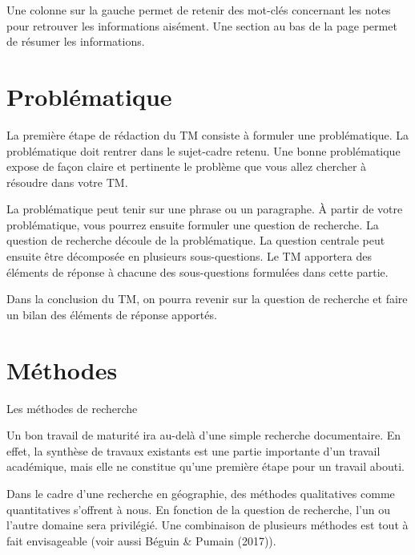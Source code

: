\documentclass[
  a4paper,
]{book}
\makeatletter
\renewcommand{\section}{\@startsection{section}{1}{\z@}
{-4ex \@plus -1ex \@minus -.4ex}
{1ex \@plus.2ex }
{\normalfont\large\sffamily\bfseries}}
\makeatother
\begin{document}
Une colonne sur la gauche permet de retenir des mot-clés concernant les
notes pour retrouver les informations aisément. Une section au bas de la
page permet de résumer les informations.

\hypertarget{probluxe9matique}{%
\chapter{Problématique}\label{probluxe9matique}}

La première étape de rédaction du TM consiste à formuler une
problématique. La problématique doit rentrer dans le sujet-cadre retenu.
Une bonne problématique expose de façon claire et pertinente le problème
que vous allez chercher à résoudre dans votre TM.

La problématique peut tenir sur une phrase ou un paragraphe. À partir de
votre problématique, vous pourrez ensuite formuler une question de
recherche. La question de recherche découle de la problématique. La
question centrale peut ensuite être décomposée en plusieurs
sous-questions. Le TM apportera des éléments de réponse à chacune des
sous-questions formulées dans cette partie.

Dans la conclusion du TM, on pourra revenir sur la question de recherche
et faire un bilan des éléments de réponse apportés.

\hypertarget{sec-methodes}{%
\chapter{Méthodes}\label{sec-methodes}}

\hypertarget{les-muxe9thodes-de-recherche}{%
\section{Les méthodes de recherche}\label{les-muxe9thodes-de-recherche}}

Un bon travail de maturité ira au-delà d'une simple recherche
documentaire. En effet, la synthèse de travaux existants est une partie
importante d'un travail académique, mais elle ne constitue qu'une
première étape pour un travail abouti.

Dans le cadre d'une recherche en géographie, des méthodes qualitatives
comme quantitatives s'offrent à nous. En fonction de la question de
recherche, l'un ou l'autre domaine sera privilégié. Une combinaison de
plusieurs méthodes est tout à fait envisageable (voir aussi Béguin \&
Pumain (2017)).
\end{document}
